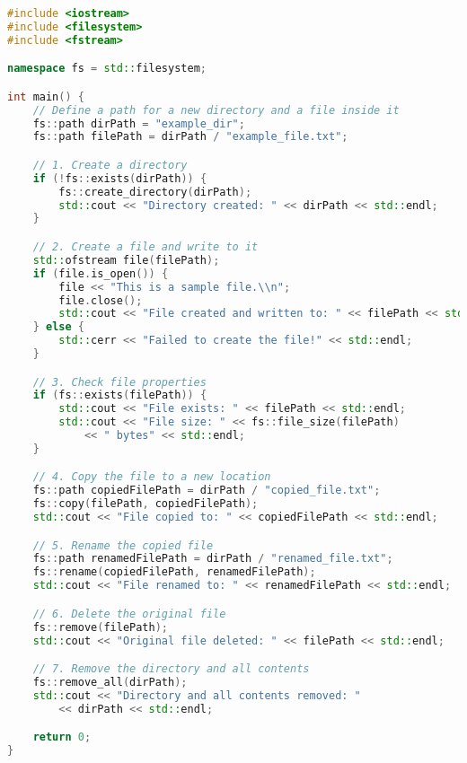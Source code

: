 
\begin{lstlisting}[language=cpp]
#include <iostream>
#include <filesystem>
#include <fstream>

namespace fs = std::filesystem;

int main() {
    // Define a path for a new directory and a file inside it
    fs::path dirPath = "example_dir";
    fs::path filePath = dirPath / "example_file.txt";

    // 1. Create a directory
    if (!fs::exists(dirPath)) {
        fs::create_directory(dirPath);
        std::cout << "Directory created: " << dirPath << std::endl;
    }

    // 2. Create a file and write to it
    std::ofstream file(filePath);
    if (file.is_open()) {
        file << "This is a sample file.\\n";
        file.close();
        std::cout << "File created and written to: " << filePath << std::endl;
    } else {
        std::cerr << "Failed to create the file!" << std::endl;
    }

    // 3. Check file properties
    if (fs::exists(filePath)) {
        std::cout << "File exists: " << filePath << std::endl;
        std::cout << "File size: " << fs::file_size(filePath)
            << " bytes" << std::endl;
    }

    // 4. Copy the file to a new location
    fs::path copiedFilePath = dirPath / "copied_file.txt";
    fs::copy(filePath, copiedFilePath);
    std::cout << "File copied to: " << copiedFilePath << std::endl;

    // 5. Rename the copied file
    fs::path renamedFilePath = dirPath / "renamed_file.txt";
    fs::rename(copiedFilePath, renamedFilePath);
    std::cout << "File renamed to: " << renamedFilePath << std::endl;

    // 6. Delete the original file
    fs::remove(filePath);
    std::cout << "Original file deleted: " << filePath << std::endl;

    // 7. Remove the directory and all contents
    fs::remove_all(dirPath);
    std::cout << "Directory and all contents removed: "
        << dirPath << std::endl;

    return 0;
}
\end{lstlisting}

